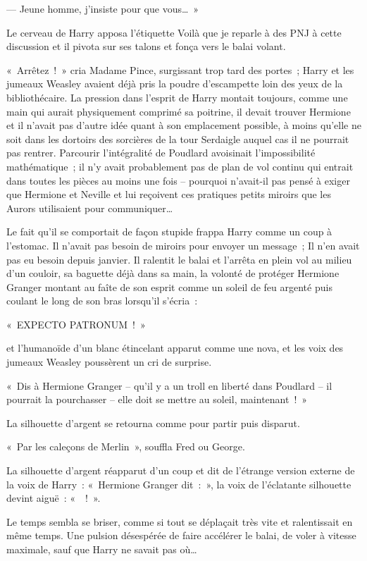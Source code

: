 --- Jeune homme, j'insiste pour que vous…~»

Le cerveau de Harry apposa l'étiquette Voilà que je reparle à des PNJ à cette discussion et il pivota sur ses talons et fonça vers le balai volant.

«~Arrêtez~!~» cria Madame Pince, surgissant trop tard des portes~; Harry et les jumeaux Weasley avaient déjà pris la poudre d'escampette loin des yeux de la bibliothécaire. La pression dans l'esprit de Harry montait toujours, comme une main qui aurait physiquement comprimé sa poitrine, il devait trouver Hermione et il n'avait pas d'autre idée quant à son emplacement possible, à moins qu'elle ne soit dans les dortoirs des sorcières de la tour Serdaigle auquel cas il ne pourrait pas rentrer. Parcourir l'intégralité de Poudlard avoisinait l'impossibilité mathématique~; il n'y avait probablement pas de plan de vol continu qui entrait dans toutes les pièces au moins une fois -- pourquoi n'avait-il pas pensé à exiger que Hermione et Neville et lui reçoivent ces pratiques petits miroirs que les Aurors utilisaient pour communiquer…

Le fait qu'il se comportait de façon stupide frappa Harry comme un coup à l'estomac. Il n'avait pas besoin de miroirs pour envoyer un message~; Il n'en avait pas eu besoin depuis janvier. Il ralentit le balai et l'arrêta en plein vol au milieu d'un couloir, sa baguette déjà dans sa main, la volonté de protéger Hermione Granger montant au faîte de son esprit comme un soleil de feu argenté puis coulant le long de son bras lorsqu'il s'écria~:

«~EXPECTO PATRONUM~!~»

et l'humanoïde d'un blanc étincelant apparut comme une nova, et les voix des jumeaux Weasley poussèrent un cri de surprise.

«~Dis à Hermione Granger -- qu'il y a un troll en liberté dans Poudlard -- il pourrait la pourchasser -- elle doit se mettre au soleil, maintenant~!~»

La silhouette d'argent se retourna comme pour partir puis disparut.

«~Par les caleçons de Merlin~», souffla Fred ou George.

La silhouette d'argent réapparut d'un coup et dit de l'étrange version externe de la voix de Harry~: «~Hermione Granger dit~:~», la voix de l'éclatante silhouette devint aiguë~: «~~!~».

Le temps sembla se briser, comme si tout se déplaçait très vite et ralentissait en même temps. Une pulsion désespérée de faire accélérer le balai, de voler à vitesse maximale, sauf que Harry ne savait pas où…

